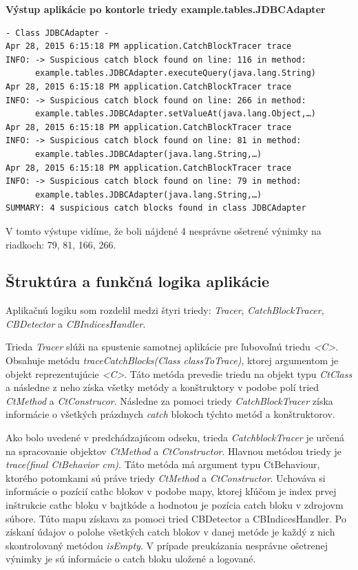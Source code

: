 \documentclass[11pt,final,oneside]{fithesis}
\newenvironment{example}[1]
{
\vspace{3mm}
\noindent\textbf{#1}
\vspace{2mm}
}
{
\vspace{3mm}
}
\begin{document}
\begin{example}{Výstup aplikácie po kontorle triedy example.tables.JDBCAdapter}
\begin{verbatim}
- Class JDBCAdapter -
Apr 28, 2015 6:15:18 PM application.CatchBlockTracer trace
INFO: -> Suspicious catch block found on line: 116 in method:
      example.tables.JDBCAdapter.executeQuery(java.lang.String)
Apr 28, 2015 6:15:18 PM application.CatchBlockTracer trace
INFO: -> Suspicious catch block found on line: 266 in method:
      example.tables.JDBCAdapter.setValueAt(java.lang.Object,…)
Apr 28, 2015 6:15:18 PM application.CatchBlockTracer trace
INFO: -> Suspicious catch block found on line: 81 in method:
      example.tables.JDBCAdapter(java.lang.String,…)
Apr 28, 2015 6:15:18 PM application.CatchBlockTracer trace
INFO: -> Suspicious catch block found on line: 79 in method:
      example.tables.JDBCAdapter(java.lang.String,…)
SUMMARY: 4 suspicious catch blocks found in class JDBCAdapter
\end{verbatim}
\end{example}

V tomto výstupe vidíme, že boli nájdené 4 nesprávne ošetrené výnimky na riadkoch: 79, 81, 166, 266.

\subsection{Štruktúra a funkčná logika aplikácie}

Aplikačnú logiku som rozdelil medzi štyri triedy: \textit{Tracer}, \textit{CatchBlockTracer}, \textit{CBDetector} a \textit{CBIndicesHandler}. 

Trieda \textit{Tracer} slúži na spustenie samotnej aplikácie pre ľubovoľnú triedu \textit{<C>}. Obsahuje metódu \textit{traceCatchBlocks(Class classToTrace)}, ktorej argumentom je objekt reprezentujúcie \textit{<C>}. Táto metóda prevedie triedu na objekt typu \textit{CtClass} a následne z neho získa všetky metódy a konštruktory v podobe polí tried \textit{CtMethod} a \textit{CtConstrucor}. Následne za pomoci triedy \textit{CatchBlockTracer} získa informácie o všetkých prázdnych \textit{catch} blokoch týchto metód a konštruktorov. 

Ako bolo uvedené v predchádzajúcom odseku, trieda \textit{CatchblockTracer} je určená na spracovanie objektov \textit{CtMethod} a \textit{CtConstructor}. Hlavnou metódou triedy je \textit{trace(final CtBehavior cm)}. Táto metóda má argument typu CtBehaviour, ktorého potomkami sú práve triedy \textit{CtMethod} a \textit{CtConstructor}. Uchováva si informácie o pozícií cathc blokov v podobe mapy, ktorej kľúčom je index prvej inštrukcie cathc bloku v bajtkóde a hodnotou je pozícia catch bloku v zdrojovm súbore. Túto mapu získava za pomoci tried CBDetector a CBIndicesHandler. Po získaní údajov o polohe všetkých catch blokov v danej metóde je každý z nich skontrolovaný metódou \textit{isEmpty}. V prípade preukázania nesprávne ošetrenej výnimky je sú informácie o catch bloku uložené a logované. 
\end{document}
